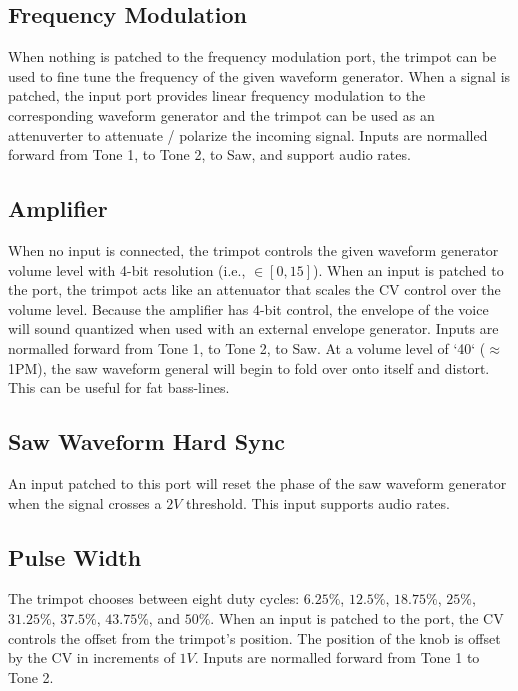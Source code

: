 \documentclass[12pt,letter]{article}
\begin{document}
\subsection{Frequency Modulation}

When nothing is patched to the frequency modulation port, the trimpot can be used to fine tune the frequency of the given waveform generator. When a signal is patched, the input port provides linear frequency modulation to the corresponding waveform generator and the trimpot can be used as an attenuverter to attenuate / polarize the incoming signal. Inputs are normalled forward from Tone 1, to Tone 2, to Saw, and support audio rates.

\subsection{Amplifier}

When no input is connected, the trimpot controls the given waveform generator volume level with 4-bit resolution (i.e., $\in [0, 15]$). When an input is patched to the port, the trimpot acts like an attenuator that scales the CV control over the volume level. Because the amplifier has 4-bit control, the envelope of the voice will sound quantized when used with an external envelope generator. Inputs are normalled forward from Tone 1, to Tone 2, to Saw. At a volume level of `40` ($\approx$ 1PM), the saw waveform general will begin to fold over onto itself and distort. This can be useful for fat bass-lines.

\subsection{Saw Waveform Hard Sync}

An input patched to this port will reset the phase of the saw waveform generator when the signal crosses a $2V$ threshold. This input supports audio rates.

\subsection{Pulse Width}

The trimpot chooses between eight duty cycles: $6.25\%$, $12.5\%$, $18.75\%$, $25\%$, $31.25\%$, $37.5\%$, $43.75\%$, and $50\%$. When an input is patched to the port, the CV controls the offset from the trimpot's position. The position of the knob is offset by the CV in increments of $1V$. Inputs are normalled forward from Tone 1 to Tone 2.
\end{document}
